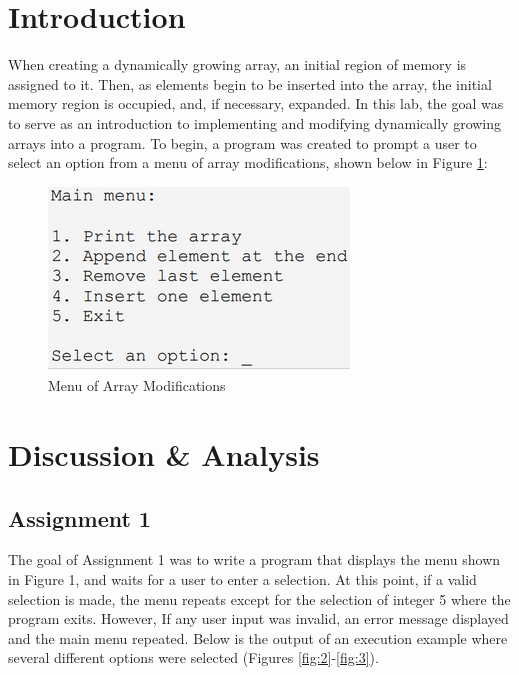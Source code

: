 \documentclass[
	letterpaper, %
	10pt, %
]{CSUniSchoolLabReport}
\begin{document}
\section{Introduction}

\hspace{.5 in} When creating a dynamically growing array, an initial region of memory is assigned to it. Then, as elements begin to be inserted into the array, the initial memory region is occupied, and, if necessary, expanded. In this lab, the goal was to serve as an introduction to implementing and modifying dynamically growing arrays into a program. To begin, a program was created to prompt a user to select an option from a menu of array modifications, shown below in Figure \ref{fig:1}:

\begin{figure}[H]
  \centering
  \includegraphics[width=.5\textwidth]{Figures/Menu.png}
  \caption{Menu of Array Modifications}
  \label{fig:1}
\end{figure}

\section{Discussion \& Analysis} 

\subsection{Assignment 1}

\hspace{.5 in} The goal of Assignment 1 was to write a program that displays the menu shown in Figure 1, and waits for a user to enter a selection. At this point, if a valid selection is made, the menu repeats except for the selection of  integer 5 where the program exits. However, If any user input was invalid, an error message displayed and the main menu repeated. Below is the output of an execution example where several different options were selected (Figures \ref{fig:2}-\ref{fig:3}).
\end{document}
